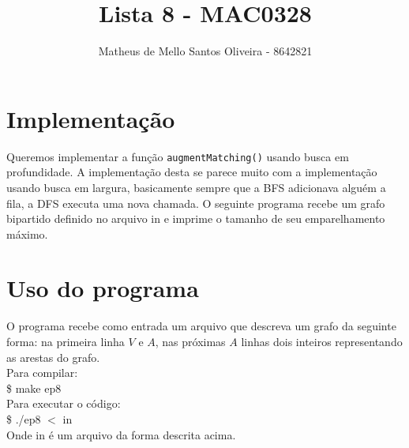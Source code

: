 \documentclass[a4paper]{article}
\title{Lista 8 - MAC0328} %
\author{Matheus de Mello Santos Oliveira - 8642821} %
\date{} %
\theoremstyle{style}
\theoremstyle{proof}
\begin{document}
\maketitle %


\section{Implementação}
Queremos implementar a função \texttt{augmentMatching()} usando busca em profundidade.
A implementação desta se parece muito com a implementação usando busca em largura,
basicamente sempre que a BFS adicionava alguém a fila, a DFS executa uma nova chamada.
O seguinte programa recebe um grafo bipartido definido no arquivo in e imprime o
tamanho de seu emparelhamento máximo.
\section{Uso do programa}
O programa recebe como entrada um arquivo que descreva um grafo da seguinte forma:
na primeira linha $V$ e $A$, nas próximas $A$ linhas dois inteiros representando
as arestas do grafo.
\\Para compilar:
\\\$ make ep8
\\Para executar o código:
\\\$ ./ep8 $<$ in
\\Onde in é um arquivo da forma descrita acima.
\end{document}
